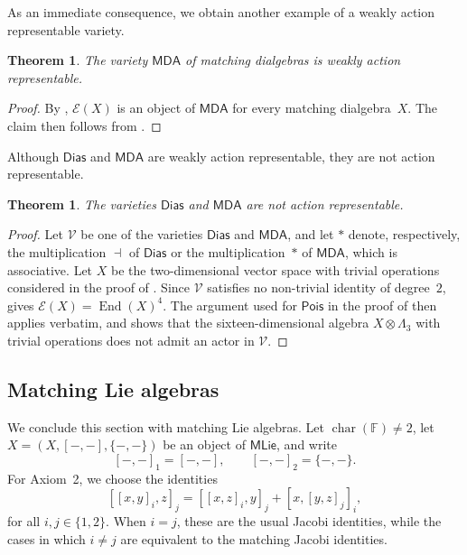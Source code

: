 \documentclass[reqno,a4paper]{amsart}
\theoremstyle{plain}
\newtheorem{theorem}[subsection]{Theorem}
\theoremstyle{definition}
\theoremstyle{remark}
\numberwithin{equation}{section}
\newcommand{\F}{\mathbb{F}}
\newcommand{\E}{\mathcal{E}}
\newcommand{\V}{\mathcal{V}}
\DeclareMathOperator{\bchar}{char}
\DeclareMathOperator{\End}{End}
\newcommand{\Pois}{\ensuremath{\mathsf{Pois}}}
\newcommand{\Match}{\ensuremath{\mathsf{MDA}}}
\newcommand{\Dias}{\ensuremath{\mathsf{Dias}}}
\newcommand{\MatchLie}{\ensuremath{\mathsf{MLie}}}
\begin{document}
As an immediate consequence, we obtain another example of a weakly action representable variety.

\begin{theorem}
The variety $\Match$ of matching dialgebras is weakly action representable.
\end{theorem}

\begin{proof}
By , $\E(X)$ is an object of $\Match$ for every matching dialgebra~$X$. The claim then follows from .
\end{proof}

Although $\Dias$ and $\Match$ are weakly action representable, they are not action representable.

\begin{theorem}\label{TheoremDiasMatchNotAR}
The varieties $\Dias$ and $\Match$ are not action representable.
\end{theorem}

\begin{proof}
Let $\V$ be one of the varieties $\Dias$ and $\Match$, and let $\ast$ denote, respectively, the multiplication $\dashv$ of $\Dias$ or the multiplication~$\ast$ of $\Match$, which is associative. Let $X$ be the two-dimensional vector space with trivial operations considered in the proof of . Since $\V$ satisfies no non-trivial identity of degree~$2$,  gives $\E(X)=\End(X)^4$. The argument used for $\Pois$ in the proof of  then applies verbatim, and shows that the sixteen-dimensional algebra $X\otimes\Lambda_3$ with trivial operations does not admit an actor in $\V$.
\end{proof}

\subsection{Matching Lie algebras}\label{SecExternalMatchingLie}

We conclude this section with matching Lie algebras. Let $\bchar(\F) \neq 2$, let $X=(X,[-,-],\{-,-\})$ be an object of $\MatchLie$, and write
\[
[-,-]_1=[-,-],
\qquad
[-,-]_2=\{-,-\}.
\]
For Axiom~2, we choose the identities
\[
[[x,y]_i,z]_j
=
[[x,z]_i,y]_j+[x,[y,z]_j]_i,
\]
for all $i,j\in\{1,2\}$. When $i=j$, these are the usual Jacobi identities, while the cases in which $i\neq j$ are equivalent to the matching Jacobi identities.
\end{document}
